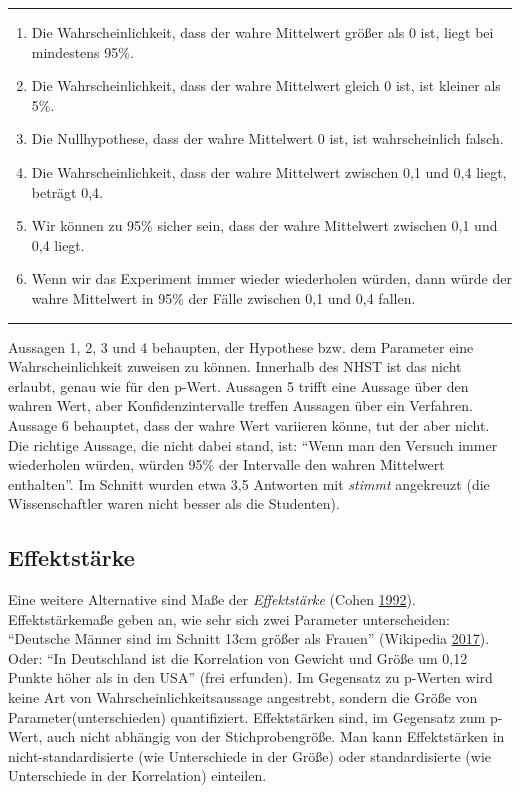 \documentclass[12pt,ngerman,]{book}
\providecommand{\tightlist}{%
  \setlength{\itemsep}{0pt}\setlength{\parskip}{0pt}}
\theoremstyle{definition}
\theoremstyle{definition}
\theoremstyle{remark}
\begin{document}
\begin{center}\rule{0.5\linewidth}{\linethickness}\end{center}

\begin{enumerate}
\def\labelenumi{\arabic{enumi}.}
\tightlist
\item
  Die Wahrscheinlichkeit, dass der wahre Mittelwert größer als 0 ist,
  liegt bei mindestens 95\%.
\item
  Die Wahrscheinlichkeit, dass der wahre Mittelwert gleich 0 ist, ist
  kleiner als 5\%.
\item
  Die Nullhypothese, dass der wahre Mittelwert 0 ist, ist wahrscheinlich
  falsch.
\item
  Die Wahrscheinlichkeit, dass der wahre Mittelwert zwischen 0,1 und 0,4
  liegt, beträgt 0,4.
\item
  Wir können zu 95\% sicher sein, dass der wahre Mittelwert zwischen 0,1
  und 0,4 liegt.
\item
  Wenn wir das Experiment immer wieder wiederholen würden, dann würde
  der wahre Mittelwert in 95\% der Fälle zwischen 0,1 und 0,4 fallen.
\end{enumerate}

\begin{center}\rule{0.5\linewidth}{\linethickness}\end{center}

Aussagen 1, 2, 3 und 4 behaupten, der Hypothese bzw. dem Parameter eine
Wahrscheinlichkeit zuweisen zu können. Innerhalb des NHST ist das nicht
erlaubt, genau wie für den p-Wert. Aussagen 5 trifft eine Aussage über
den wahren Wert, aber Konfidenzintervalle treffen Aussagen über ein
Verfahren. Aussage 6 behauptet, dass der wahre Wert variieren könne, tut
der aber nicht. Die richtige Aussage, die nicht dabei stand, ist: ``Wenn
man den Versuch immer wiederholen würden, würden 95\% der Intervalle den
wahren Mittelwert enthalten''. Im Schnitt wurden etwa 3,5 Antworten mit
\emph{stimmt} angekreuzt (die Wissenschaftler waren nicht besser als die
Studenten).

\subsection{Effektstärke}\label{effektstarke}

Eine weitere Alternative sind Maße der
\emph{Effektstärke} (Cohen
\protect\hyperlink{ref-Cohen1992}{1992}). Effektstärkemaße geben an, wie
sehr sich zwei Parameter unterscheiden: ``Deutsche Männer sind im
Schnitt 13cm größer als Frauen'' (Wikipedia
\protect\hyperlink{ref-wiki:groesse}{2017}). Oder: ``In Deutschland ist
die Korrelation von Gewicht und Größe um 0,12 Punkte höher als in den
USA'' (frei erfunden). Im Gegensatz zu p-Werten wird keine Art von
Wahrscheinlichkeitsaussage angestrebt, sondern die Größe von
Parameter(unterschieden) quantifiziert. Effektstärken sind, im Gegensatz
zum p-Wert, auch nicht abhängig von der Stichprobengröße. Man kann
Effektstärken in nicht-standardisierte (wie Unterschiede in der Größe)
oder standardisierte (wie Unterschiede in der Korrelation) einteilen.
\end{document}
